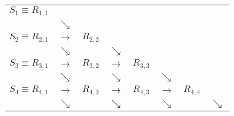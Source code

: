 \documentclass{article}
\begin{document}
\begin{table}[h]
  \centering
  \bgroup
  \setlength{\tabcolsep}{0.2em}
  \def\arraystretch{1.1}
  \begin{tabular}{cccccccc}
    $S_1 \equiv R_{1,1}$ & & & & & & & \\
    & $\searrow$ & & & & & & \\
    $S_{2} \equiv R_{2,1}$ & $\rightarrow$ & $R_{2,2}$ & & & & & \\
    & $\searrow$ & & $\searrow$ & & & & \\
    $S_{3} \equiv R_{3,1}$ & $\rightarrow$ & $R_{3,2}$ & $\rightarrow$ & $R_{3,3}$ & & & \\
    & $\searrow$ & & $\searrow$ & & $\searrow$ & & \\
    $S_{4} \equiv R_{4,1}$ & $\rightarrow$ & $R_{4,2}$ & $\rightarrow$ & $R_{4,3}$ & $\rightarrow$ & $R_{4,4}$ & \\
    & $\searrow$ & & $\searrow$ & & $\searrow$ & & $\searrow$
  \end{tabular}
  \egroup
\end{table}
\end{document}
